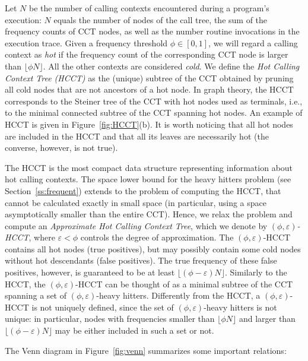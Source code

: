 \documentclass{sigplanconf}
\begin{document}
Let $N$ be the number of calling contexts encountered during a program's execution: $N$ equals the number of nodes of the call tree, the sum of the frequency counts of CCT nodes, as well as the number routine invocations in the execution trace. Given a frequency threshold $\phi\in[0,1]$, we will regard a calling context as {\em hot} if the frequency count of the corresponding CCT node is larger than $\lfloor\phi N\rfloor$. All the other contexts are considered {\em cold}. We define the {\em Hot Calling Context Tree (HCCT)} as the (unique) subtree of the CCT obtained by pruning all cold nodes that are not ancestors of a hot node. In graph theory, the HCCT corresponds to the Steiner tree of the CCT with hot nodes used as terminals, i.e., to the minimal connected subtree of the CCT spanning hot nodes. An example of HCCT is given in Figure~\ref{fig:HCCT}(b). It is worth noticing that all hot nodes are included in the HCCT and that all its leaves are necessarily hot (the converse, however, is not true).

The HCCT is the most compact data structure representing information about hot calling contexts. The space lower bound for the heavy hitters problem (see Section~\ref{ss:frequent}) extends to the problem of computing the HCCT, that cannot be calculated exactly in small space (in particular, using a space asymptotically smaller than the entire CCT). Hence, we relax the problem and compute an {\em Approximate Hot Calling Context Tree}, which we denote by {\em $(\phi,\varepsilon)$-HCCT}, where $\varepsilon<\phi$ controls the degree of approximation. The $(\phi,\varepsilon)$-HCCT contains all hot nodes (true positives), but may possibly contain some cold nodes without hot descendants (false positives). The true frequency of these false positives, however, is guaranteed to be at least $\lfloor(\phi-\varepsilon) N\rfloor$. Similarly to the HCCT, the $(\phi,\varepsilon)$-HCCT can be thought of as a minimal subtree of the CCT spanning a set of $(\phi,\varepsilon)$-heavy hitters. Differently from the HCCT, a $(\phi,\varepsilon)$-HCCT is not uniquely defined, since the set of $(\phi,\varepsilon)$-heavy hitters is not unique: in particular, nodes with frequencies smaller than $\lfloor\phi N\rfloor$ and larger than $\lfloor(\phi-\varepsilon) N\rfloor$ may be either included in such a set or not.

The Venn diagram in Figure~\ref{fig:venn} summarizes some important relations:
\end{document}
